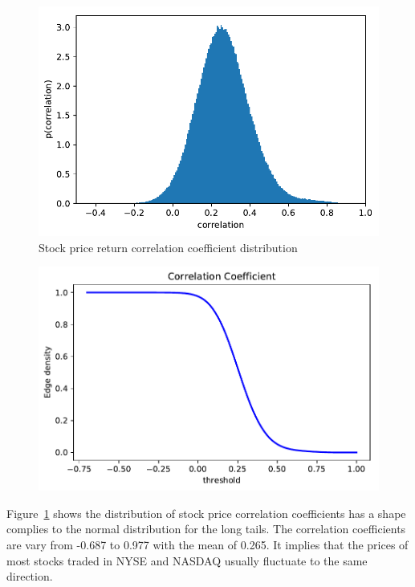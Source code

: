 \begin{figure}
	\begin{center}
		\includegraphics[width=14cm]{correlation_distribution}
	\end{center}
	\caption{Stock price return correlation coefficient distribution}
	\label{fig:correlation_distribution}  
\end{figure}

\begin{figure}
	\begin{center}
		\includegraphics[width=14cm]{correlation_edge_density}
	\end{center}
	\caption{}
	\label{fig:correlation_edge_density}  
\end{figure}

Figure~\ref{fig:correlation_distribution} shows the distribution of stock price correlation coefficients has a shape complies to the normal distribution for the long tails. The correlation coefficients are vary from -0.687 to 0.977 with the mean of 0.265. It implies that the prices of most stocks traded in NYSE and NASDAQ usually fluctuate to the same direction.

